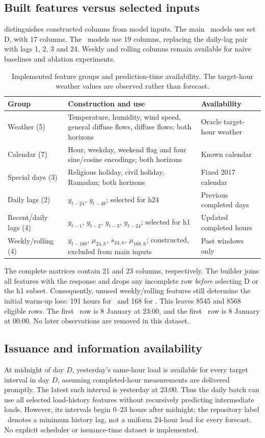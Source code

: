 \subsection{Built features versus selected inputs}
 distinguishes constructed columns from model inputs. The main \hday\ models use set D, with 17 columns. The \hone\ models use 19 columns, replacing the daily-lag pair with lags 1, 2, 3 and 24. Weekly and rolling columns remain available for naive baselines and ablation experiments.
\begin{table}[tbp]\centering\small
\caption{Implemented feature groups and prediction-time availability. The target-hour weather values are observed rather than forecast.}\label{tab:features}
\begin{tabularx}{\linewidth}{@{}p{.18\linewidth}Xp{.22\linewidth}@{}}\toprule
Group & Construction and use & Availability \\\midrule
Weather (5) & Temperature, humidity, wind speed, general diffuse flows, diffuse flows; both horizons & Oracle target-hour weather \\
Calendar (7) & Hour, weekday, weekend flag and four sine/cosine encodings; both horizons & Known calendar \\
Special days (3) & Religious holiday, civil holiday, Ramadan; both horizons & Fixed 2017 calendar \\
Daily lags (2) & $y_{t-24}$, $y_{t-48}$; selected for h24 & Previous completed days \\
Recent/daily lags (4) & $y_{t-1}$, $y_{t-2}$, $y_{t-3}$, $y_{t-24}$; selected for h1 & Updated completed hours \\
Weekly/rolling (4) & $y_{t-168}$, $\mu_{24,h}$, $s_{24,h}$, $\mu_{168,h}$; constructed, excluded from main inputs & Past windows only \\
\bottomrule\end{tabularx}
\end{table}

The complete matrices contain 21 and 23 columns, respectively. The builder joins all features with the response and drops any incomplete row \emph{before} selecting D or the h1 subset. Consequently, unused weekly/rolling features still determine the initial warm-up loss: 191 hours for \hday\ and 168 for \hone. This leaves \num{8545} and \num{8568} eligible rows. The first \hday\ row is 8 January at 23:00, and the first \hone\ row is 8 January at 00:00. No later observations are removed in this dataset.

\subsection{Issuance and information availability}
At midnight of day $D$, yesterday's same-hour load is available for every target interval in day $D$, assuming completed-hour measurements are delivered promptly. The latest such interval is yesterday at 23:00. Thus the daily batch can use all selected load-history features without recursively predicting intermediate loads. However, its intervals begin 0--23 hours after midnight; the repository label \hday\ denotes a minimum history lag, not a uniform 24-hour lead for every forecast. No explicit scheduler or issuance-time dataset is implemented.

